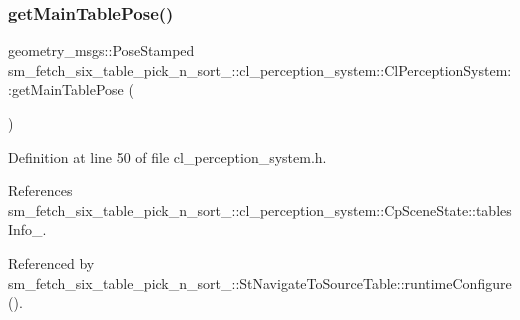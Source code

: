 \subsubsection{\texorpdfstring{get\+Main\+Table\+Pose()}{getMainTablePose()}}
{\footnotesize\ttfamily geometry\+\_\+msgs\+::\+Pose\+Stamped sm\+\_\+fetch\+\_\+six\+\_\+table\+\_\+pick\+\_\+n\+\_\+sort\+\_\+::cl\+\_\+perception\+\_\+system\+::\+Cl\+Perception\+System\+::get\+Main\+Table\+Pose (\begin{DoxyParamCaption}{ }\end{DoxyParamCaption})\hspace{0.3cm}{\ttfamily [inline]}}



Definition at line 50 of file cl\+\_\+perception\+\_\+system.\+h.



References sm\+\_\+fetch\+\_\+six\+\_\+table\+\_\+pick\+\_\+n\+\_\+sort\+\_\+::cl\+\_\+perception\+\_\+system\+::\+Cp\+Scene\+State\+::tables\+Info\+\_\+.



Referenced by sm\+\_\+fetch\+\_\+six\+\_\+table\+\_\+pick\+\_\+n\+\_\+sort\+\_\+::\+St\+Navigate\+To\+Source\+Table\+::runtime\+Configure().


